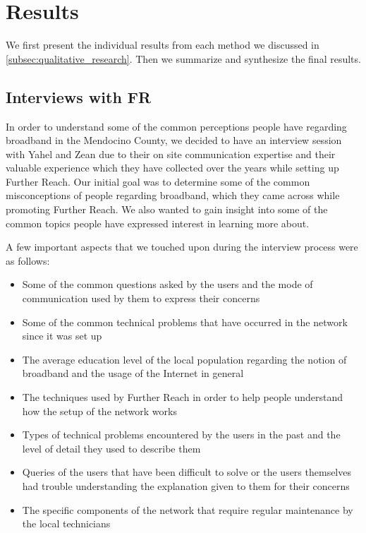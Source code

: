 \section{Results}
\label{sec:results}

We first present the individual results from each method we discussed in
\autoref{subsec:qualitative_research}. Then we summarize and synthesize the
final results.

\subsection{Interviews with FR}
\label{sec:interviews-with-fr}

In order to understand some of the common perceptions people have regarding
broadband in the Mendocino County, we decided to have an interview session
with Yahel and Zean due to their on site communication expertise and their
valuable experience which they have collected over the years while setting up
Further Reach. Our initial goal was to determine some of the common
misconceptions of people regarding broadband, which they came across while
promoting Further Reach. We also wanted to gain insight into some of the
common topics people have expressed interest in learning more about.

A few important aspects that we touched upon during the interview process were as follows:
\begin{itemize}
\item Some of the common questions asked by the users and the mode of communication used by them to express their concerns
\item Some of the common technical problems that have occurred in the network
since it was set up
\item The average education level of the local population regarding the notion of broadband and the usage of the Internet in general
\item The techniques used by Further Reach in order to help people understand how the setup of the network works
\item Types of technical problems encountered by the users in the past and the level of detail they used to describe them
\item Queries of the users that have been difficult to solve or the users themselves had trouble understanding the explanation given to them for their concerns
\item The specific components of the network that require regular maintenance by the local technicians
\end{itemize}

